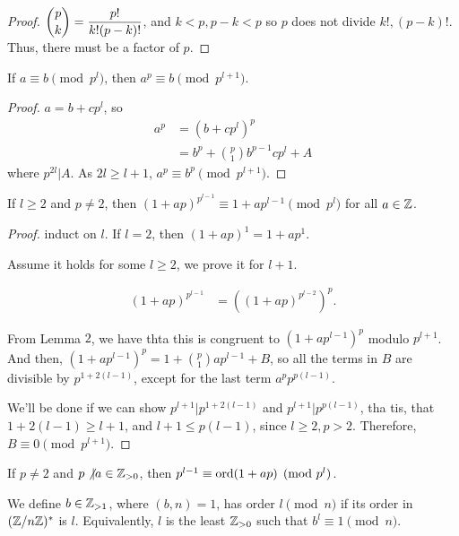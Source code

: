 \documentclass{article}
\begin{document}
\begin{proof} 
	$\dbinom{p}{k} = \dfrac{p!}{k!(p-k)!}$, and $k < p, p-k < p$ so $p$ does not divide $k!, (p-k)!$. Thus, there must be a factor of $p$.
\end{proof}

\begin{lemma}
	If $a \equiv b \pmod{p^l}$, then $a^p \equiv b \pmod{p^{l+1}}$. 
\end{lemma}

\begin{proof}
	$a = b + cp^l$, so \begin{align*}
		a^p &= (b+cp^l)^p \\
		&= b^p + \binom{p}{1}b^{p-1} cp^l + A
	\end{align*}
	where $p^{2l} | A$. As $2l \geq l + 1$, $a^p \equiv b^p \pmod{p^{l+1}}$.
\end{proof}

\begin{corollary}
	If $l \geq 2$ and $p \neq 2$, then $(1 + ap)^{p^{l-1}} \equiv 1 + ap^{l-1} \pmod{p^l}$ for all $a \in \mathbb Z$.
\end{corollary}

\begin{proof}
	induct on $l$. If $l = 2$, then $(1 + ap)^1 = 1 + ap^1$.

	Assume it holds for some $l \geq 2$, we prove it for $l + 1$.

	\begin{align*}
		(1 + ap)^{p^{l-1}} &= ((1 + ap)^{p^{l-2}})^p.
	\end{align*}

	From Lemma $2$, we have thta this is congruent to $(1 + ap^{l-1})^p$ modulo $p^{l + 1}$. 
	And then, $(1 + ap^{l-1})^p = 1 + \binom{p}{1}ap^{l-1} + B$, so all the terms in $B$ are divisible by $p^{1 + 2(l-1)}$, except for the last term $a^p p^{p(l-1)}$. 

	We'll be done if we can show $p^{l+1} | p^{1 + 2(l-1)}$ and $p^{l + 1} | p^{p(l-1)}$, tha tis, that $1 + 2(l - 1) \geq l + 1$, and $l + 1 \leq p(l - 1)$, since $l \geq 2, p > 2$. Therefore, $B \equiv 0 \pmod{p^{l+1}}$.
\end{proof}

\begin{corollary}
	If $p \neq 2$ and $p \not \vert a \in \mathbb Z_{> 0}$, then $p^{l-1} \equiv \operatorname{ord}(1 + ap) \pmod{p^l}$.
\end{corollary}

We define $b \in \mathbb Z_{> 1}$, where $(b, n) = 1$, has order $l \pmod n$ if its order in $(\mathbb Z/n\mathbb Z)^*$ is $l$. Equivalently, $l$ is the least $\mathbb Z_{> 0}$ such that $b^l \equiv 1 \pmod n$. 
\end{document}
